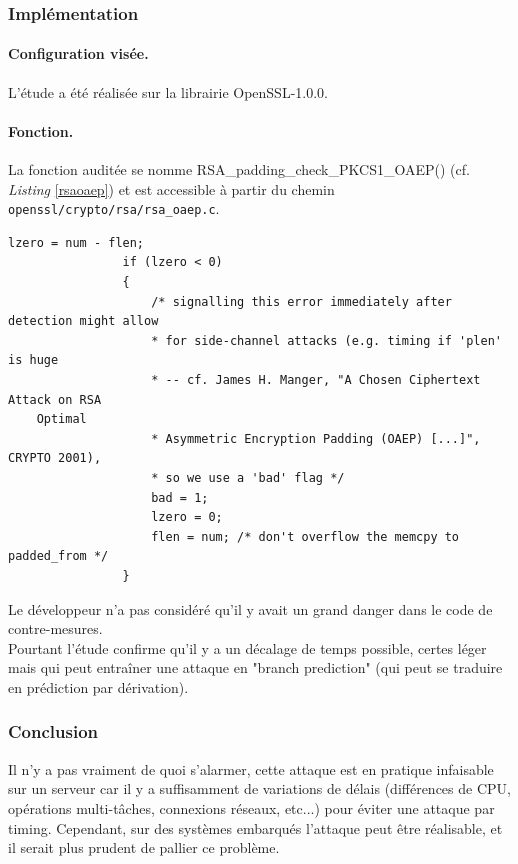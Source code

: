 		
		\subsubsection{Implémentation}
			
			\paragraph{Configuration visée.\\}
			
			L'étude a été réalisée sur la librairie OpenSSL-1.0.0.
			
			\paragraph{Fonction.\\}
			
			La fonction auditée se nomme RSA\_padding\_check\_PKCS1\_OAEP() (cf. \textit{Listing} \ref{rsaoaep}) et est accessible à partir du chemin \texttt{openssl/crypto/rsa/rsa\_oaep.c}.
		
		
			\begin{lstlisting}[style=customc,caption=rsa\_oaep.c,
			label=rsaoaep]
				lzero = num - flen;
				if (lzero < 0)
				{
					/* signalling this error immediately after detection might allow
					* for side-channel attacks (e.g. timing if 'plen' is huge
					* -- cf. James H. Manger, "A Chosen Ciphertext Attack on RSA
	Optimal
					* Asymmetric Encryption Padding (OAEP) [...]", CRYPTO 2001),
					* so we use a 'bad' flag */
					bad = 1;
					lzero = 0;
					flen = num; /* don't overflow the memcpy to padded_from */
				}
			\end{lstlisting}
		
			Le développeur n'a pas considéré qu'il y avait un grand danger dans le code de contre-mesures.\\
			Pourtant l'étude confirme qu'il y a un décalage de temps possible, certes léger mais qui peut entraîner une attaque en "branch prediction" (qui peut se traduire en prédiction par dérivation).\\
			
		\subsubsection{Conclusion}
		
			Il n'y a pas vraiment de quoi s'alarmer, cette attaque est en pratique infaisable sur un serveur car il y a suffisamment de variations de délais (différences de CPU, opérations multi-tâches, connexions réseaux, etc...) pour éviter une attaque par timing. Cependant, sur des systèmes embarqués l'attaque peut être réalisable, et il serait plus prudent de pallier ce problème.
			
